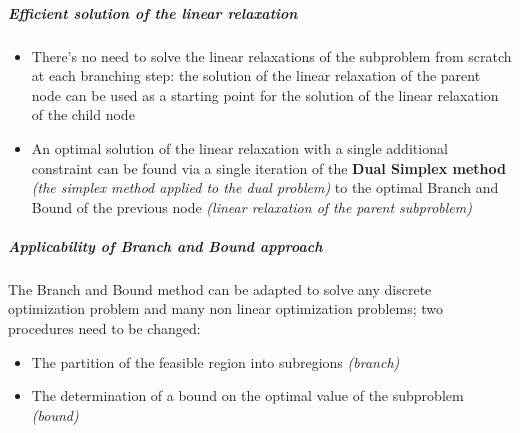 \documentclass[english]{article}
\begin{document}
\subparagraph*{Efficient solution of the linear relaxation}
\begin{itemize}
  \item There's no need to solve the linear relaxations of the \ILP subproblem from scratch at each branching step: the solution of the linear relaxation of the parent node can be used as a starting point for the solution of the linear relaxation of the child node
  \item An optimal solution of the linear relaxation with a single additional constraint can be found via a single iteration of the \textbf{Dual Simplex method} \textit{(the simplex method applied to the dual problem)} to the optimal Branch and Bound of the previous node \textit{(linear relaxation of the parent subproblem)}
\end{itemize}

\subparagraph*{Applicability of Branch and Bound approach}

The Branch and Bound method can be adapted to solve any discrete optimization problem and many non linear optimization problems;
two procedures need to be changed:

\begin{itemize}
  \item The partition of the feasible region into subregions \textit{(branch)}
  \item The determination of a bound on the optimal value of the subproblem \textit{(bound)}
\end{itemize}
\end{document}
